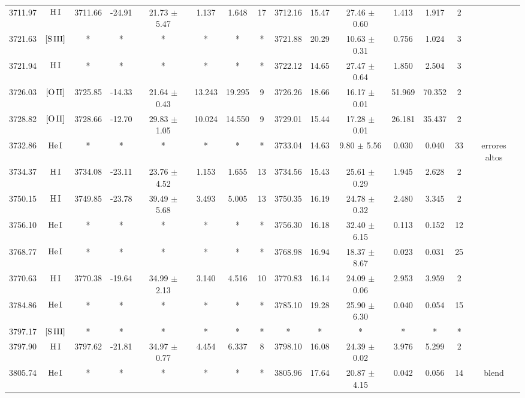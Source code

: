 \documentclass{article}
\begin{document}
\begin{table*}
\begin{adjustbox}{width=\textwidth}
\begin{tabular}{ccccccccccccccc}
3711.97 & $\mbox{H}\thinspace \mbox{I}$ & 3711.66 & -24.91 & 21.73 $\pm$ 5.47 & 1.137 & 1.648 & 17 & 3712.16 & 15.47 & 27.46 $\pm$ 0.60 & 1.413 & 1.917 & 2 &  \\
3721.63 & $\mbox{[S}\thinspace \mbox{III]}$ & * & * & * & * & * & * & 3721.88 & 20.29 & 10.63 $\pm$ 0.31 & 0.756 & 1.024 & 3 &  \\
3721.94 & $\mbox{H}\thinspace \mbox{I}$ & * & * & * & * & * & * & 3722.12 & 14.65 & 27.47 $\pm$ 0.64 & 1.850 & 2.504 & 3 &  \\
3726.03 & $\mbox{[O}\thinspace \mbox{II]}$ & 3725.85 & -14.33 & 21.64 $\pm$ 0.43 & 13.243 & 19.295 & 9 & 3726.26 & 18.66 & 16.17 $\pm$ 0.01 & 51.969 & 70.352 & 2 &  \\
3728.82 & $\mbox{[O}\thinspace \mbox{II]}$ & 3728.66 & -12.70 & 29.83 $\pm$ 1.05 & 10.024 & 14.550 & 9 & 3729.01 & 15.44 & 17.28 $\pm$ 0.01 & 26.181 & 35.437 & 2 &  \\
3732.86 & $\mbox{He}\thinspace \mbox{I}$ & * & * & * & * & * & * & 3733.04 & 14.63 & 9.80 $\pm$ 5.56 & 0.030 & 0.040 & 33 &  errores altos \\
3734.37 & $\mbox{H}\thinspace \mbox{I}$ & 3734.08 & -23.11 & 23.76 $\pm$ 4.52 & 1.153 & 1.655 & 13 & 3734.56 & 15.43 & 25.61 $\pm$ 0.29 & 1.945 & 2.628 & 2 &  \\
3750.15 & $\mbox{H}\thinspace \mbox{I}$ & 3749.85 & -23.78 & 39.49 $\pm$ 5.68 & 3.493 & 5.005 & 13 & 3750.35 & 16.19 & 24.78 $\pm$ 0.32 & 2.480 & 3.345 & 2 &  \\
3756.10 & $\mbox{He}\thinspace \mbox{I}$ & * & * & * & * & * & * & 3756.30 & 16.18 & 32.40 $\pm$ 6.15 & 0.113 & 0.152 & 12 &  \\
3768.77 & $\mbox{He}\thinspace \mbox{I}$ & * & * & * & * & * & * & 3768.98 & 16.94 & 18.37 $\pm$ 8.67 & 0.023 & 0.031 & 25 &  \\
3770.63 & $\mbox{H}\thinspace \mbox{I}$ & 3770.38 & -19.64 & 34.99 $\pm$ 2.13 & 3.140 & 4.516 & 10 & 3770.83 & 16.14 & 24.09 $\pm$ 0.06 & 2.953 & 3.959 & 2 &  \\
3784.86 & $\mbox{He}\thinspace \mbox{I}$ & * & * & * & * & * & * & 3785.10 & 19.28 & 25.90 $\pm$ 6.30 & 0.040 & 0.054 & 15 &  \\
3797.17 & $\mbox{[S}\thinspace \mbox{III]}$ & * & * & * & * & * & * & * & * & * & * & * & * &  \\
3797.90 & $\mbox{H}\thinspace \mbox{I}$ & 3797.62 & -21.81 & 34.97 $\pm$ 0.77 & 4.454 & 6.337 & 8 & 3798.10 & 16.08 & 24.39 $\pm$ 0.02 & 3.976 & 5.299 & 2 &  \\
3805.74 & $\mbox{He}\thinspace \mbox{I}$ & * & * & * & * & * & * & 3805.96 & 17.64 & 20.87 $\pm$ 4.15 & 0.042 & 0.056 & 14 &  blend \\

\end{tabular}
\end{adjustbox}
\end{table*}
\end{document}
